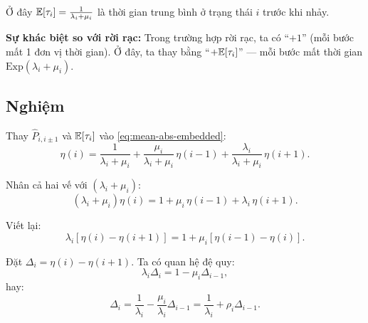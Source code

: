 Ở đây $\mathbb{E}[\tau_i] = \frac{1}{\lambda_i + \mu_i}$ là thời gian trung bình ở trạng thái $i$ trước khi nhảy.

\textbf{Sự khác biệt so với rời rạc:} Trong trường hợp rời rạc, ta có ``$+1$'' (mỗi bước mất 1 đơn vị thời gian).
Ở đây, ta thay bằng ``$+\mathbb{E}[\tau_i]$'' --- mỗi bước mất thời gian $\text{Exp}(\lambda_i + \mu_i)$.

\subsection{Nghiệm}

Thay $\hat{P}_{i,i\pm 1}$ và $\mathbb{E}[\tau_i]$ vào \eqref{eq:mean-abs-embedded}:
\[
  \eta(i) = \frac{1}{\lambda_i + \mu_i} + \frac{\mu_i}{\lambda_i + \mu_i}\, \eta(i-1) + \frac{\lambda_i}{\lambda_i + \mu_i}\, \eta(i+1).
\]

Nhân cả hai vế với $(\lambda_i + \mu_i)$:
\[
  (\lambda_i + \mu_i)\eta(i) = 1 + \mu_i\, \eta(i-1) + \lambda_i\, \eta(i+1).
\]

Viết lại:
\begin{equation}\label{eq:mean-abs-recurrence}
  \lambda_i[\eta(i) - \eta(i+1)] = 1 + \mu_i[\eta(i-1) - \eta(i)].
\end{equation}

Đặt $\Delta_i = \eta(i) - \eta(i+1)$. Ta có quan hệ đệ quy:
\[
  \lambda_i \Delta_i = 1 - \mu_i \Delta_{i-1},
\]
hay:
\[
  \Delta_i = \frac{1}{\lambda_i} - \frac{\mu_i}{\lambda_i} \Delta_{i-1}
  = \frac{1}{\lambda_i} + \rho_i \Delta_{i-1}.
\]

